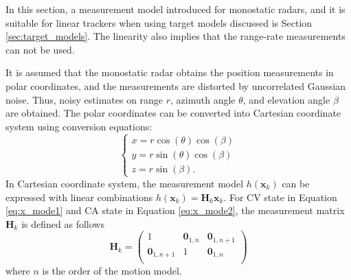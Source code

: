 \documentclass[english, 12pt, a4paper, elec, utf8, a-1b, online]{aaltothesis}
\renewcommand{\vec}[1]{\mathbf{#1}}
\newcommand{\x}{\vec{x}_k}
\newcommand{\omodel}{\vec{H}_k}
\begin{document}
In this section, a measurement model introduced for monostatic radars, and it is suitable for linear trackers when using target models discussed is Section \ref{sec:target_models}.
The linearity also implies that the range-rate measurements can not be used.

It is assumed that the monostatic radar obtains the position measurements in polar coordinates, and the measurements are distorted by uncorrelated Gaussian noise.
Thus, noisy estimates on range $r$, azimuth angle $\theta$, and elevation angle $\beta$ are obtained.
The polar coordinates can be converted into Cartesian coordinate system using conversion equations:
\begin{equation}
\left\{
\begin{array}{l}
    x = r \cos(\theta) \cos(\beta) \\
    y = r \sin(\theta) \cos(\beta) \\
    z = r \sin(\beta).
\end{array}\right.
\end{equation}
In Cartesian coordinate system, the measurement model $h(\x)$ can be expressed with linear combinations $h(\x) = \omodel \x$.
For CV state in Equation \eqref{eq:x_mode1} and CA state in Equation \eqref{eq:x_mode2}, the measurement matrix $\omodel$ is defined as follows
\begin{equation}\label{eq:position_measurement_matrix}
    \omodel = 
       \begin{pmatrix}
            1 & \vec{0}_{1, n} & \vec{0}_{1, n+1}\\ 
            \vec{0}_{1, n+1} & 1 & \vec{0}_{1, n}\\ 
        \end{pmatrix}
\end{equation}
where $n$ is the order of the motion model.
\end{document}
